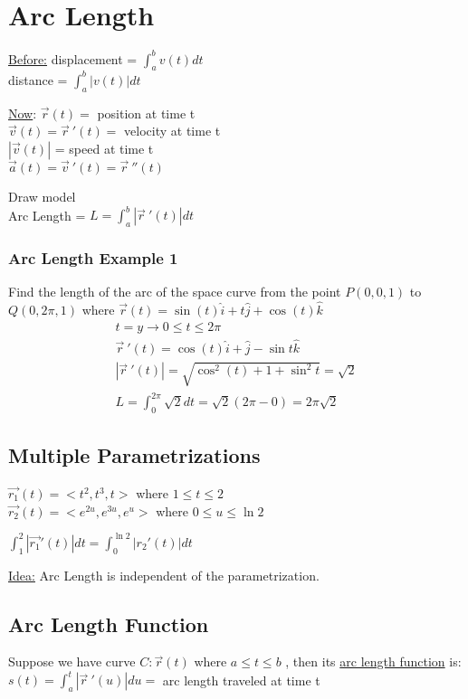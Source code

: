 \documentclass[12pt]{article}
\begin{document}
\section{Arc Length}

\underline{Before:} displacement = \(\int_{a}^{b} v(t)dt\) \\%
distance = \(\int_{a}^{b} |v(t)|dt\)\

\underline{Now}: \(\vec{r} (t) = \) position at time t\\%
\(\vec{v} (t) = \vec{r}\ '(t) =    \) velocity at time t\\%
\(|\vec{v} (t)| \) = speed at time t\\%
\(\vec{a} (t) = \vec{v}\ '(t) = \vec{r}\ ''(t)   \) 

Draw model\\%
Arc Length = \(L =\int_{a}^{b} |\vec{r}\ '(t) |dt\) 

\subsubsection{Arc Length Example 1}
Find the length of the arc of the space curve from the point \(P(0,0,1)\) to \(Q(0,2\pi,1)\) where \(\vec{r} (t) = \sin(t)\hat{i} + t\hat{j} + \cos(t)\hat{k} \) 
\begin{align}
	t=y \rightarrow 0 \leq	t \leq	2\pi\\%
	\vec{r}\ '(t) = \cos(t)\hat{i} + \hat{j} - \sin{t}\hat{k}\\%
	|\vec{r}\ '(t) | = \sqrt{\cos^2(t) + 1 + \sin^2{t}}= \sqrt{2}\\%
	L = \int_{0}^{2\pi}\sqrt{2}dt = \sqrt{2}(2\pi - 0) = 2\pi\sqrt{2}	
\end{align}

\subsection{Multiple Parametrizations}
\(\vec{r_1} (t) = <t^2,t^3,t>\) where \( 1\leq t\leq 2 \) \\%
\(\vec{r_2} (t) = <e^{2u},e^{3u},e^u>  \) where \(0 \leq u \leq \ln{2}\) 

\(\int_{1}^{2} |\vec{r_1}' (t)| dt = \int_{0}^{\ln{2}} |r_2'(t)|dt\) 

\underline{Idea:} Arc Length is independent of the parametrization.

\subsection{Arc Length Function}
Suppose we have curve \(C: \vec{r} (t) \) where \(a\leq t\leq b\)  , then its \underline{arc length function} is:\\%
\(s(t) = \int_{a}^{t} |\vec{r}\ '(u) |du = \) arc length traveled at time t
\end{document}
